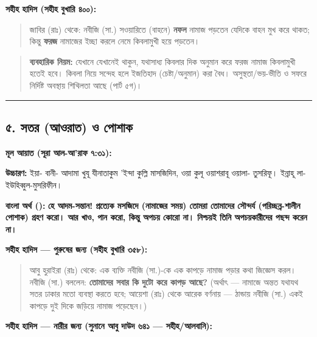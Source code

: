 \textbf{সহীহ হাদিস (সহীহ বুখারি ৪০০):}

\begin{quote}
জাবির (রাঃ) থেকে: নবীজি (সা.) সওয়ারিতে (বাহনে) \textbf{নফল} নামাজ পড়তেন যেদিকে বাহন মুখ করে থাকত; কিন্তু \textbf{ফরজ} নামাজের ইচ্ছা করলে নেমে কিবলামুখী হয়ে পড়তেন।
\end{quote}

\begin{quote}
\textbf{ব্যবহারিক নিয়ম:} যেখানে যেখানেই থাকুন, যথাসাধ্য কিবলার দিক অনুমান করে ফরজ নামাজ কিবলামুখী হতেই হবে। কিবলা নিয়ে সন্দেহ হলে ইজতিহাদ (চেষ্টা/অনুমান) করা বৈধ। অসুস্থতা/ভয়-ভীতি ও সফরে নির্দিষ্ট অবস্থায় শিথিলতা আছে (পার্ট ৫গ)।
\end{quote}

\medskip\hrule\medskip

\subsection*{৫. সতর (আওরাত) ও পোশাক}

\textbf{মূল আয়াত (সূরা আল-আ'রাফ ৭:৩১):}

\begin{center}\end{center}

\textbf{উচ্চারণ:} ইয়া- বানী- আদামা খুযূ যীনাতাকুম 'ইন্দা কুল্লি মাসজিদিন, ওয়া কুলূ ওয়াশরাবূ ওয়ালা- তুসরিফূ। ইন্নাহূ লা- ইউহিব্বুল-মুসরিফীন।

\textbf{বাংলা অর্থ ():}
\textbf{হে আদম-সন্তান! প্রত্যেক মসজিদে (নামাজের সময়) তোমরা তোমাদের সৌন্দর্য (পরিচ্ছন্ন-শালীন পোশাক) গ্রহণ করো। আর খাও, পান করো, কিন্তু অপচয় কোরো না। নিশ্চয়ই তিনি অপচয়কারীদের পছন্দ করেন না।}

\textbf{সহীহ হাদিস — পুরুষের জন্য (সহীহ বুখারি ৩৫৮):}

\begin{quote}
আবু হুরাইরা (রাঃ) থেকে: এক ব্যক্তি নবীজি (সা.)-কে এক কাপড়ে নামাজ পড়ার কথা জিজ্ঞেস করল। নবীজি (সা.) বললেন: \textbf{তোমাদের সবার কি দুটো করে কাপড় আছে?} (অর্থাৎ — নামাজে অন্তত যথাযথ সতর ঢাকার মতো ব্যবস্থা করতে হবে; আয়েশা (রাঃ) থেকে আরেক বর্ণনায় — ঠান্ডায় নবীজি (সা.) একই কাপড়ে দুই দিকে জড়িয়ে নামাজ পড়েছেন।)
\end{quote}

\textbf{সহীহ হাদিস — নারীর জন্য (সুনানে আবু দাউদ ৬৪১ — সহীহ/আলবানি):}

